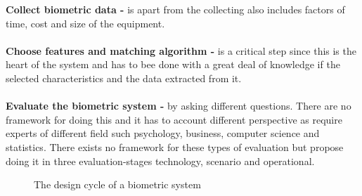 \textbf{Collect biometric data -} is apart from the collecting also includes factors of time, cost and size of the equipment.\\
\\
\textbf{Choose features and matching algorithm -} is a critical step since this is the heart of the system and has to bee done with a great deal of knowledge if the selected characteristics and the data extracted from it. \\
\\
\textbf{Evaluate the biometric system -} by asking different questions. There are no framework for doing this and it has to account different perspective as require experts of different field such psychology, business, computer science and statistics. There exists no framework for these types of evaluation but \cite[]{introbio} propose doing it in three evaluation-stages technology, scenario and operational.

\begin{figure}[!ht]
	
	\caption{\label{fig:biodesigncycle} The design cycle of a biometric system}
\end{figure}
